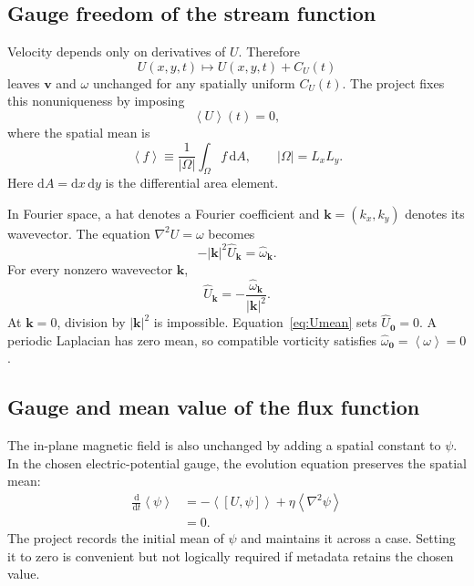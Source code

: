 \documentclass[11pt]{article}
\newcommand{\dd}{\mathrm{d}}
\newcommand{\vect}[1]{\bm{#1}}
\newcommand{\average}[1]{\left\langle #1\right\rangle}
\begin{document}
\subsection{Gauge freedom of the stream function}

Velocity depends only on derivatives of $U$. Therefore
\begin{equation}
U(x,y,t)\mapsto U(x,y,t)+C_U(t)
\end{equation}
leaves $\vect{v}$ and $\omega$ unchanged for any spatially uniform $C_U(t)$. The project fixes this nonuniqueness by imposing
\begin{equation}
\boxed{\average{U}(t)=0,}
\label{eq:Umean}
\end{equation}
where the spatial mean is
\begin{equation}
\average{f}
\equiv\frac{1}{|\Omega|}\int_\Omega f\,\dd A,
\qquad |\Omega|=L_xL_y.
\end{equation}
Here $\dd A=\dd x\,\dd y$ is the differential area element.

In Fourier space, a hat denotes a Fourier coefficient and $\vect{k}=(k_x,k_y)$ denotes its wavevector. The equation $\nabla^2U=\omega$ becomes
\begin{equation}
-|\vect{k}|^2\widehat{U}_{\vect{k}}=\widehat{\omega}_{\vect{k}}.
\end{equation}
For every nonzero wavevector $\vect{k}$,
\begin{equation}
\widehat{U}_{\vect{k}}
=-\frac{\widehat{\omega}_{\vect{k}}}{|\vect{k}|^2}.
\end{equation}
At $\vect{k}=0$, division by $|\vect{k}|^2$ is impossible. Equation~\eqref{eq:Umean} sets $\widehat U_{\vect{0}}=0$. A periodic Laplacian has zero mean, so compatible vorticity satisfies $\widehat\omega_{\vect{0}}=\average{\omega}=0$.

\subsection{Gauge and mean value of the flux function}

The in-plane magnetic field is also unchanged by adding a spatial constant to $\psi$. In the chosen electric-potential gauge, the evolution equation preserves the spatial mean:
\begin{align}
\frac{\dd}{\dd t}\average{\psi}
&=-\average{[U,\psi]}+\eta\average{\nabla^2\psi}\\
&=0.
\end{align}
The project records the initial mean of $\psi$ and maintains it across a case. Setting it to zero is convenient but not logically required if metadata retains the chosen value.
\end{document}

